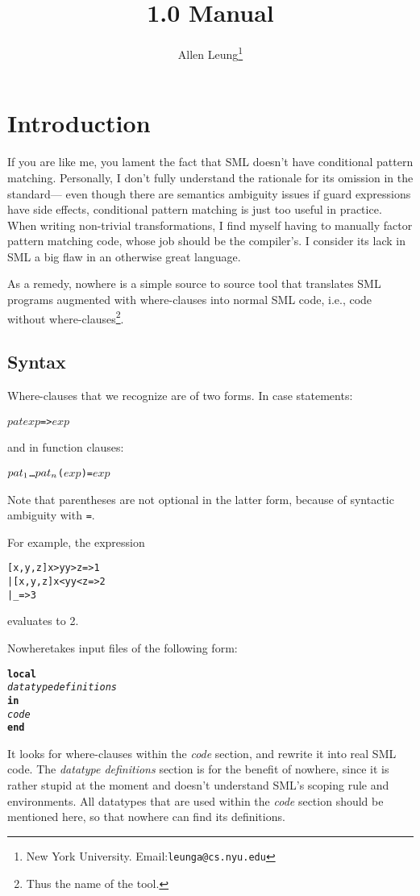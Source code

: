 \documentclass{article}
\title{\Nowhere{} 1.0 Manual}
\author{Allen Leung\thanks{New York University. Email:{\tt leunga@cs.nyu.edu}}}
\newcommand{\nowhere}{{\sf nowhere}}
\newcommand{\Nowhere}{{\sf Nowhere}}
\newcommand{\OF}{{\bf of}}
\begin{document}
   \maketitle
\section{Introduction}
If you are like me, you lament the fact that SML doesn't have conditional
pattern matching.  Personally, I don't fully understand the rationale for its
omission in the standard--- even though there are semantics ambiguity 
issues if guard expressions have side effects, conditional pattern matching
is just too useful in practice.   When writing non-trivial transformations, I
find myself having to manually factor pattern matching code, 
whose job should be the compiler's.
I consider its lack in SML a big flaw in an otherwise great language.

  As a remedy, \nowhere{} is a simple source to source tool that translates
SML programs augmented with where-clauses into normal SML code, i.e.,
code without where-clauses\footnote{Thus the name of the tool.}.  

\subsection{Syntax}
Where-clauses that we recognize are of two forms.
In case statements:
\begin{alltt}
    \(pat\) \WHERE \(exp\) => \(exp\)
\end{alltt}
and in function clauses:
\begin{alltt}
    \(pat\sb{1}\) \ldots \(pat\sb{n}\) \WHERE (\(exp\)) = \(exp\)
\end{alltt}
Note that parentheses are not optional in the latter form, because
of syntactic ambiguity with \verb|=|.

For example, the expression
\begin{alltt}
   \CASE [1,2,3] \OF 
      [x,y,z] \WHERE x>y \ANDALSO y>z => 1
    | [x,y,z] \WHERE x<y \ANDALSO y<z => 2
    | _ => 3
\end{alltt}
evaluates to 2.

\Nowhere takes input files of the following form:
\begin{alltt}
{\bf local}
    {\sl datatype definitions}
{\bf in}
    {\sl code}
{\bf end}
\end{alltt}
It looks for where-clauses within the {\sl code} section, and rewrite it into
real SML code.  The {\sl datatype definitions} section is for the benefit
of \nowhere, since it is rather stupid at the moment and doesn't understand
SML's scoping rule and environments.  
All datatypes that are used within the {\sl code}
section should be mentioned here, so that \nowhere{} can find its definitions.
\end{document}
